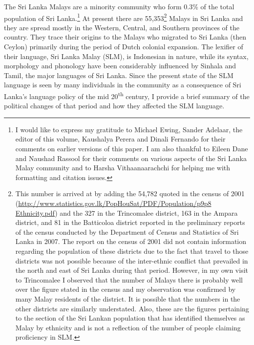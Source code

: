 The Sri Lanka Malays are a minority community who form 0.3\% of the total population of Sri Lanka.\footnote{I 
 would like to express my gratitude to Michael Ewing, Sander Adelaar, the editor of this volume, Kaushalya Perera and Dinali Fernando for their comments on earlier versions of this paper. I am also thankful to Eileen Dane and Naushad Rassool for their comments on various aspects of the Sri Lanka Malay community and to Harsha Vithaanaarachchi for helping me with formatting and citation issues. 
}
 At present there are 55,353\footnote{This
  number is arrived at by adding the 54,782 quoted in the census of 2001 (\url{http://www.statistics.gov.lk/PopHouSat/PDF/Population/p9p8 Ethnicity.pdf}) and the 327 in the Trincomalee district, 163 in the Ampara district, and 81 in the Batticoloa district reported in the preliminary reports of the census conducted by the Department of Census and Statistics of Sri Lanka in 2007. The report on the census of 2001 did not contain information regarding the population of these districts due to the fact that travel to those districts was not possible because of the inter-ethnic conflict that prevailed in the north and east of Sri Lanka during that period. However, in my own visit to Trincomalee I observed that the number of Malays there is probably well over the figure stated in the census and my observation was confirmed by many Malay residents of the district. It is possible that the numbers in the other districts are similarly understated. Also, these are the figures pertaining to the section of the Sri Lankan population that has identified themselves as Malay by ethnicity and is not a reflection of the number of people claiming proficiency in SLM.
}
Malays in Sri Lanka and they are spread mostly in the Western, Central, and Southern provinces of the country. They trace their origins to the Malays who migrated to Sri Lanka (then Ceylon) primarily during the period of Dutch colonial expansion. The lexifier of their language, Sri Lanka Malay (SLM), is Indonesian in nature, while its syntax, morphology and phonology have been considerably influenced by Sinhala and Tamil, the major languages of Sri Lanka. Since the present state of the SLM language is seen by many individuals in the community as a consequence of Sri Lanka's language policy of the mid 20\textsuperscript{th} century, I provide a brief summary of the political changes of that period and how they affected the SLM language. 

